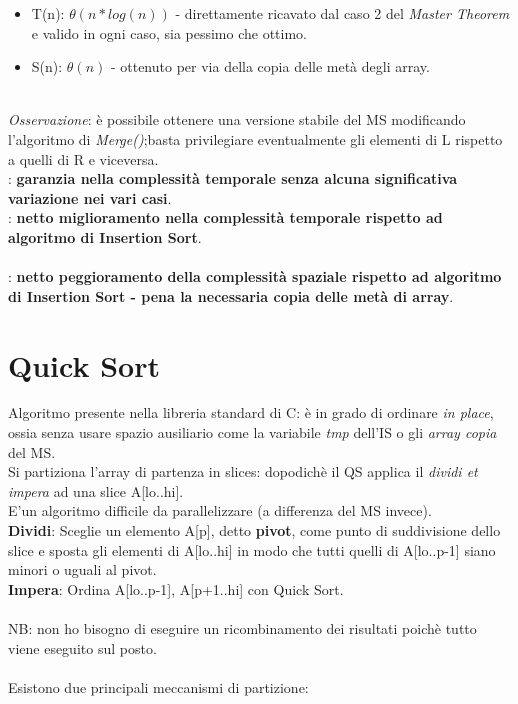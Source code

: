 \documentclass{article}
\begin{document}
    \begin{itemize}
        \item T(n): $\theta(n*log(n))$ - direttamente ricavato dal caso 2 del \emph{Master Theorem} e valido in ogni caso, sia pessimo che ottimo.
        \item S(n): $\theta(n)$ - ottenuto per via della copia delle metà degli array.
    \end{itemize}
    \\
    \emph{Osservazione}: è possibile ottenere una versione stabile del MS modificando l'algoritmo di \emph{Merge()};basta privilegiare eventualmente gli elementi di L rispetto a quelli di R e viceversa.\\

\smiley: \textbf{garanzia nella complessità temporale senza alcuna significativa variazione nei vari casi}.\\
\smiley: \textbf{netto miglioramento nella complessità temporale rispetto ad algoritmo di Insertion Sort}.\\
\\
\frownie: \textbf{netto peggioramento della complessità spaziale rispetto ad algoritmo di Insertion Sort - pena la necessaria copia delle metà di array}.

    \section{Quick Sort}
    Algoritmo presente nella libreria standard di C: è in grado di ordinare \emph{in place}, ossia senza usare spazio ausiliario come la variabile \emph{tmp} dell'IS o gli \emph{array copia} del MS.\\
    Si partiziona l'array di partenza in slices: dopodichè il QS applica il \emph{dividi et impera} ad una slice A[lo..hi].\\
    E'un algoritmo difficile da parallelizzare (a differenza del MS invece).
    \\
    \textbf{Dividi}: Sceglie un elemento A[p], detto \textbf{pivot}, come punto di suddivisione dello slice e sposta gli elementi di A[lo..hi] in modo che tutti quelli di A[lo..p-1] siano minori o uguali al pivot.\\
    \textbf{Impera}: Ordina A[lo..p-1], A[p+1..hi] con Quick Sort.\\
    \\
    NB: non ho bisogno di eseguire un ricombinamento dei risultati poichè tutto viene eseguito sul posto.\\
    \\
    Esistono due principali meccanismi di partizione:
\end{document}
